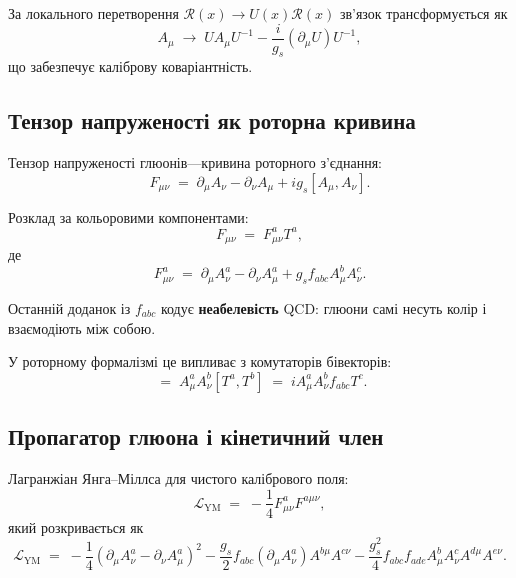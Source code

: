 \documentclass[11pt,a4paper]{article}
\newcommand{\Rotor}{\mathcal{R}}
\newcommand{\Lag}{\mathcal{L}}
\theoremstyle{definition}
\theoremstyle{plain}
\theoremstyle{remark}
\begin{document}
За локального перетворення $\Rotor(x)\to U(x)\Rotor(x)$ зв’язок трансформується як
\begin{equation}
A_\mu \;\to\; U A_\mu U^{-1} - \frac{i}{g_s}(\partial_\mu U) U^{-1},
\end{equation}
що забезпечує каліброву коваріантність.

\subsection{Тензор напруженості як роторна кривина}

Тензор напруженості глюонів—кривина роторного з’єднання:
\begin{equation}
F_{\mu\nu} \;=\; \partial_\mu A_\nu - \partial_\nu A_\mu + ig_s [A_\mu, A_\nu].
\label{eq:field-strength}
\end{equation}

Розклад за кольоровими компонентами:
\begin{equation}
F_{\mu\nu} \;=\; F_{\mu\nu}^a T^a,
\end{equation}
де
\begin{equation}
F_{\mu\nu}^a \;=\; \partial_\mu A_\nu^a - \partial_\nu A_\mu^a + g_s f_{abc} A_\mu^b A_\nu^c.
\label{eq:gluon-field-strength}
\end{equation}

Останній доданок із $f_{abc}$ кодує \textbf{неабелевість} QCD: глюони самі несуть колір і взаємодіють між собою.

У роторному формалізмі це випливає з комутаторів бівекторів:
\begin{equation}
[A_\mu,A_\nu] \;=\; A_\mu^a A_\nu^b [T^a,T^b] \;=\; i A_\mu^a A_\nu^b f_{abc} T^c.
\end{equation}

\subsection{Пропагатор глюона і кінетичний член}

Лагранжіан Янга–Міллса для чистого калібрового поля:
\begin{equation}
\Lag_{\mathrm{YM}} \;=\; -\frac{1}{4}F_{\mu\nu}^a F^{a\mu\nu},
\label{eq:yang-mills-lagrangian}
\end{equation}
який розкривається як
\begin{equation}
\Lag_{\mathrm{YM}} \;=\; -\frac{1}{4}(\partial_\mu A_\nu^a - \partial_\nu A_\mu^a)^2 - \frac{g_s}{2}f_{abc}(\partial_\mu A_\nu^a)A^{b\mu}A^{c\nu} - \frac{g_s^2}{4}f_{abc}f_{ade}A_\mu^b A_\nu^c A^{d\mu}A^{e\nu}.
\end{equation}
\end{document}
